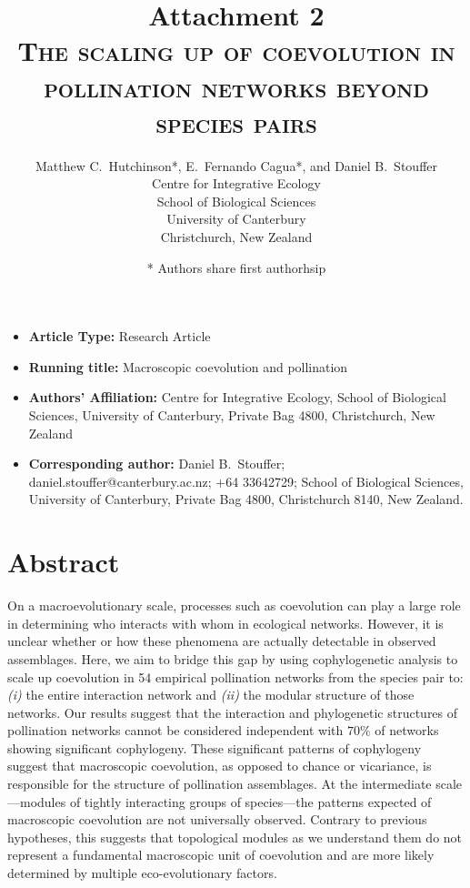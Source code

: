 \documentclass{article}
\title{{\normalsize Attachment 2} \\
	{\LARGE \textsc{The scaling up of coevolution in pollination networks beyond species pairs}}}
\author{Matthew C.\ Hutchinson*, E.\ Fernando Cagua*, and Daniel B.\ Stouffer\\
\normalsize{Centre for Integrative Ecology}\\
\normalsize{School of Biological Sciences}\\
\normalsize{University of Canterbury}\\
\normalsize{Christchurch, New Zealand}}
\date{* Authors share first authorhsip}
\begin{document}
\maketitle
\baselineskip=8.5mm
\vspace{0.4 in}

\begin{itemize}
\item {\bfseries Article Type:} Research Article
\item {\bfseries Running title:} Macroscopic coevolution and pollination
\item {\bfseries Authors' Affiliation:} Centre for Integrative Ecology, School of Biological Sciences, University of Canterbury, Private Bag 4800, Christchurch, New Zealand
\item {\bfseries Corresponding author:} Daniel B.\ Stouffer; daniel.stouffer@canterbury.ac.nz; +64 33642729; School of Biological Sciences, University of Canterbury, Private Bag 4800, Christchurch 8140, New Zealand.
\end{itemize}
\clearpage

\linenumbers

\section*{Abstract}

On a macroevolutionary scale, processes such as coevolution can play a large role in determining who interacts with whom in ecological networks. However, it is unclear whether or how these phenomena are actually detectable in observed assemblages. Here, we aim to bridge this gap by using cophylogenetic analysis to scale up coevolution in 54 empirical pollination networks from the species pair to: \emph{(i)} the entire interaction network and \emph{(ii)} the modular structure of those networks. Our results suggest that the interaction and phylogenetic structures of pollination networks cannot be considered independent with $70\%$ of networks showing significant cophylogeny. These significant patterns of cophylogeny suggest that macroscopic coevolution, as opposed to chance or vicariance, is responsible for the structure of pollination assemblages. At the intermediate scale---modules of tightly interacting groups of species---the patterns expected of macroscopic coevolution are not universally observed. Contrary to previous hypotheses, this suggests that topological modules as we understand them do not represent a fundamental macroscopic unit of coevolution and are more likely determined by multiple eco-evolutionary factors.
\end{document}
